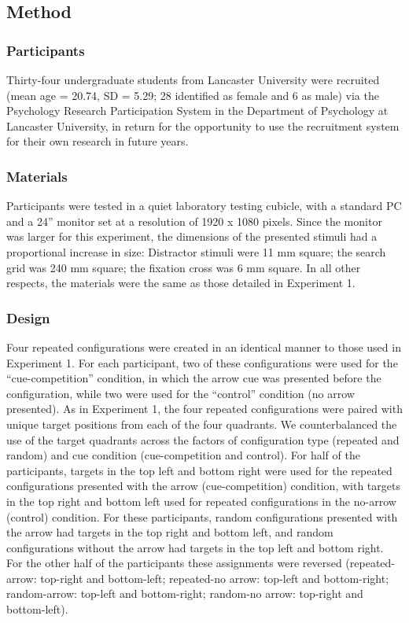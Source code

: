 \documentclass[
  man,floatsintext]{apa7}
\begin{document}
\hypertarget{method-1}{%
\subsection{Method}\label{method-1}}

\hypertarget{participants-1}{%
\subsubsection{Participants}\label{participants-1}}

Thirty-four undergraduate students from Lancaster University were recruited (mean age = 20.74, SD = 5.29; 28 identified as female and 6 as male) via the Psychology Research Participation System in the Department of Psychology at Lancaster University, in return for the opportunity to use the recruitment system for their own research in future years.

\hypertarget{materials-1}{%
\subsubsection{Materials}\label{materials-1}}

Participants were tested in a quiet laboratory testing cubicle, with a standard PC and a 24'' monitor set at a resolution of 1920 x 1080 pixels. Since the monitor was larger for this experiment, the dimensions of the presented stimuli had a proportional increase in size: Distractor stimuli were 11 mm square; the search grid was 240 mm square; the fixation cross was 6 mm square. In all other respects, the materials were the same as those detailed in Experiment 1.

\hypertarget{design-1}{%
\subsubsection{Design}\label{design-1}}

Four repeated configurations were created in an identical manner to those used in Experiment 1. For each participant, two of these configurations were used for the ``cue-competition'' condition, in which the arrow cue was presented before the configuration, while two were used for the ``control'' condition (no arrow presented). As in Experiment 1, the four repeated configurations were paired with unique target positions from each of the four quadrants. We counterbalanced the use of the target quadrants across the factors of configuration type (repeated and random) and cue condition (cue-competition and control). For half of the participants, targets in the top left and bottom right were used for the repeated configurations presented with the arrow (cue-competition) condition, with targets in the top right and bottom left used for repeated configurations in the no-arrow (control) condition. For these participants, random configurations presented with the arrow had targets in the top right and bottom left, and random configurations without the arrow had targets in the top left and bottom right. For the other half of the participants these assignments were reversed (repeated-arrow: top-right and bottom-left; repeated-no arrow: top-left and bottom-right; random-arrow: top-left and bottom-right; random-no arrow: top-right and bottom-left).
\end{document}
